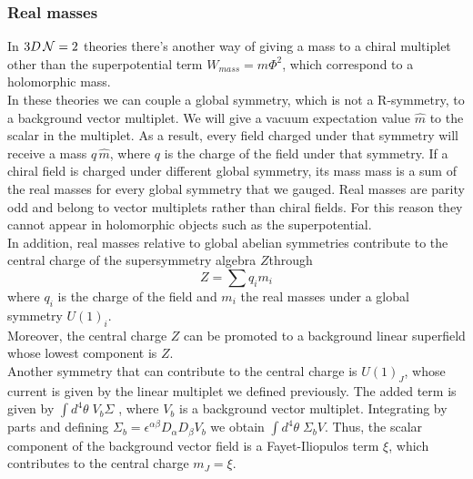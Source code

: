 \subsubsection{Real masses}

In $3 D \, \mathcal{N}=2$ theories there's another way of giving a mass to a chiral multiplet other than the superpotential term $W_{mass}= m \Phi^2$, which correspond to a holomorphic mass.\\
In these theories we can couple a global symmetry, which is not a R-symmetry, to a background vector multiplet.
We will give a vacuum expectation value $\hat{m} $ to the scalar in the multiplet.
As a result, every field charged under that symmetry will receive a mass $q \, \hat{m}$, where $q$ is the charge of the field under that symmetry.
If a chiral field is charged under different global symmetry, its mass  mass is a sum of the real masses for every global symmetry that we gauged.
Real masses are parity odd and belong to vector multiplets rather than chiral fields. For this reason they cannot appear in holomorphic objects such as the superpotential.\\
In addition, real masses relative to global abelian symmetries contribute to the central charge of the supersymmetry algebra $Z$through
\begin{equation}
  Z = \sum q_i m_i
 \end{equation} 
 where $q_i$ is the charge of the field and $m_i$ the real masses under a global symmetry $U(1)_i$.\\
 Moreover, the central charge $Z$ can be promoted to a background linear superfield whose lowest component is $Z$.\\
 Another symmetry that can contribute to the central charge is $U(1)_J$, whose current is given by the linear multiplet we defined previously.
 The added term is given by $\int d^4 \theta \; V_b \Sigma $ , where $V_b$ is a background vector multiplet.
 Integrating by parts and defining  $\Sigma_b = \epsilon^{\alpha \beta} D_{\alpha} D_{\beta} V_b$ we obtain $\int d^4 \theta \; \Sigma_b V  $.
 Thus, the scalar component of the background vector field is a Fayet-Iliopulos term $\xi$, which contributes to the central charge $m_J = \xi $.

 













